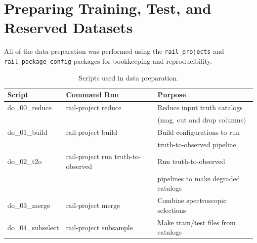 \section{Preparing Training, Test, and Reserved Datasets}
\label{sec:prep_process}

All of the data preparation was performed using the
\texttt{rail\_projects} and \texttt{rail\_package\_config} packages
for bookkeeping and reproducibility.

\begin{table}[ht]
\centering
\caption{\label{tab:prep_scripts}\small Scripts used
  in data preparation.}
\begin{tabular}{lll}
\hline \hline
Script & Command Run & Purpose \\ \hline
  do\_00\_reduce & rail-project reduce & Reduce input truth catalogs \\
  &  & (mag. cut and drop columns) \\ 
do\_01\_build & rail-project build & Build configurations to run \\
  &  & truth-to-observed pipeline \\
do\_02\_t2o & rail-project run truth-to-observed & Run truth-to-observed \\
  &  & pipelines to make degraded catalogs \\ 
do\_03\_merge & rail-project merge & Combine spectroscopic selections \\
do\_04\_subselect & rail-project subsample & Make train/test files from catalogs\\
\hline\hline
\end{tabular}
\end{table}
